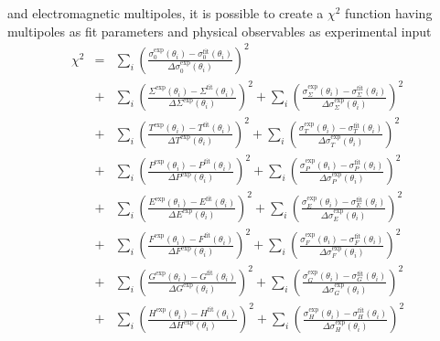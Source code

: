 \documentclass[a4paper,10pt]{article}
\begin{document}
and electromagnetic multipoles, it is possible to create a $\chi^2$ function having multipoles as fit parameters and physical
observables as experimental input
\begin{displaymath}
\begin{array}{lcl}
\chi^2
&=& \sum\limits_i \left(
\frac
{\sigma_0^\mathrm{exp}(\theta_i) - \sigma_0^\mathrm{fit}(\theta_i)}
{\Delta \sigma_0^\mathrm{exp}(\theta_i)}
\right)^2\\
&+& \sum\limits_i \left(
\frac
{\Sigma^\mathrm{exp}(\theta_i) - \Sigma^\mathrm{fit}(\theta_i)}
{\Delta \Sigma^\mathrm{exp}(\theta_i)}
\right)^2
+ \sum\limits_i \left(
\frac
{\sigma_\Sigma^\mathrm{exp}(\theta_i) - \sigma_\Sigma^\mathrm{fit}(\theta_i)}
{\Delta \sigma_\Sigma^\mathrm{exp}(\theta_i)}
\right)^2\\
&+& \sum\limits_i \left(
\frac
{T^\mathrm{exp}(\theta_i) - T^\mathrm{fit}(\theta_i)}
{\Delta T^\mathrm{exp}(\theta_i)}
\right)^2
+ \sum\limits_i \left(
\frac
{\sigma_T^\mathrm{exp}(\theta_i) - \sigma_T^\mathrm{fit}(\theta_i)}
{\Delta \sigma_T^\mathrm{exp}(\theta_i)}
\right)^2\\
&+& \sum\limits_i \left(
\frac
{P^\mathrm{exp}(\theta_i) - P^\mathrm{fit}(\theta_i)}
{\Delta P^\mathrm{exp}(\theta_i)}
\right)^2
+ \sum\limits_i \left(
\frac
{\sigma_P^\mathrm{exp}(\theta_i) - \sigma_P^\mathrm{fit}(\theta_i)}
{\Delta \sigma_P^\mathrm{exp}(\theta_i)}
\right)^2\\
&+& \sum\limits_i \left(
\frac
{E^\mathrm{exp}(\theta_i) - E^\mathrm{fit}(\theta_i)}
{\Delta E^\mathrm{exp}(\theta_i)}
\right)^2
+ \sum\limits_i \left(
\frac
{\sigma_E^\mathrm{exp}(\theta_i) - \sigma_E^\mathrm{fit}(\theta_i)}
{\Delta \sigma_E^\mathrm{exp}(\theta_i)}
\right)^2\\
&+& \sum\limits_i \left(
\frac
{F^\mathrm{exp}(\theta_i) - F^\mathrm{fit}(\theta_i)}
{\Delta F^\mathrm{exp}(\theta_i)}
\right)^2
+ \sum\limits_i \left(
\frac
{\sigma_F^\mathrm{exp}(\theta_i) - \sigma_F^\mathrm{fit}(\theta_i)}
{\Delta \sigma_F^\mathrm{exp}(\theta_i)}
\right)^2\\
&+& \sum\limits_i \left(
\frac
{G^\mathrm{exp}(\theta_i) - G^\mathrm{fit}(\theta_i)}
{\Delta G^\mathrm{exp}(\theta_i)}
\right)^2
+ \sum\limits_i \left(
\frac
{\sigma_G^\mathrm{exp}(\theta_i) - \sigma_G^\mathrm{fit}(\theta_i)}
{\Delta \sigma_G^\mathrm{exp}(\theta_i)}
\right)^2\\
&+& \sum\limits_i \left(
\frac
{H^\mathrm{exp}(\theta_i) - H^\mathrm{fit}(\theta_i)}
{\Delta H^\mathrm{exp}(\theta_i)}
\right)^2
+ \sum\limits_i \left(
\frac
{\sigma_H^\mathrm{exp}(\theta_i) - \sigma_H^\mathrm{fit}(\theta_i)}
{\Delta \sigma_H^\mathrm{exp}(\theta_i)}
\right)^2
\end{array}
\end{displaymath}
\end{document}

